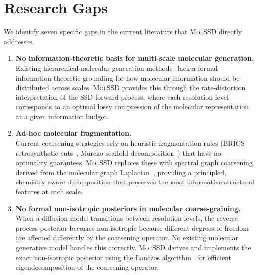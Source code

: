 \documentclass[11pt,a4paper]{article}
\newcommand{\molssd}{\textsc{MolSSD}}
\begin{document}
\section{Research Gaps}

We identify seven specific gaps in the current literature that \molssd{} directly addresses.

\begin{enumerate}[leftmargin=*,label=\textbf{Gap~\arabic*.}]

  \item \textbf{No information-theoretic basis for multi-scale molecular generation.} \\
    Existing hierarchical molecular generation methods~\citep{qiang2023hierdiff} lack a
    formal information-theoretic grounding for how molecular information should be
    distributed across scales. \molssd{} provides this through the rate-distortion
    interpretation of the SSD forward process, where each resolution level corresponds to
    an optimal lossy compression of the molecular representation at a given information
    budget.

  \item \textbf{Ad-hoc molecular fragmentation.} \\
    Current coarsening strategies rely on heuristic fragmentation rules (BRICS
    retrosynthetic cuts~\citep{degen2008brics}, Murcko scaffold
    decomposition~\citep{bemis1996murcko}) that have no optimality guarantees.
    \molssd{} replaces these with spectral graph coarsening derived from the molecular
    graph Laplacian~\citep{chung1997spectral}, providing a principled,
    chemistry-aware decomposition that preserves the most informative structural
    features at each scale.

  \item \textbf{No formal non-isotropic posteriors in molecular coarse-graining.} \\
    When a diffusion model transitions between resolution levels, the reverse-process
    posterior becomes non-isotropic because different degrees of freedom are affected
    differently by the coarsening operator. No existing molecular generative model
    handles this correctly. \molssd{} derives and implements the exact non-isotropic
    posterior using the Lanczos algorithm~\citep{lanczos1950iteration} for efficient
    eigendecomposition of the coarsening operator.


\end{enumerate}
\end{document}
